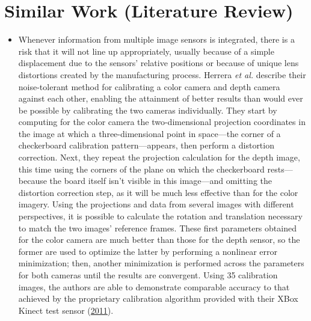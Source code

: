 \documentclass[12pt]{report}
\begin{document}
\section{Similar Work (Literature Review)}
\begin{itemize}
\item{Whenever information from multiple image sensors is integrated, there is a risk that it will not line up appropriately, usually because of a simple displacement due to the sensors' relative positions or because of unique lens distortions created by the manufacturing process.  Herrera \textit{et al.} describe their noise-tolerant method for calibrating a color camera and depth camera against each other, enabling the attainment of better results than would ever be possible by calibrating the two cameras individually.  They start by computing for the color camera the two-dimensional projection coordinates in the image at which a three-dimensional point in space---the corner of a checkerboard calibration pattern---appears, then perform a distortion correction.  Next, they repeat the projection calculation for the depth image, this time using the corners of the plane on which the checkerboard rests---because the board itself isn't visible in this image---and omitting the distortion correction step, as it will be much less effective than for the color imagery.  Using the projections and data from several images with different perspectives, it is possible to calculate the rotation and translation necessary to match the two images' reference frames.  These first parameters obtained for the color camera are much better than those for the depth sensor, so the former are used to optimize the latter by performing a nonlinear error minimization; then, another minimization is performed across the parameters for both cameras until the results are convergent.  Using 35 calibration images, the authors are able to demonstrate comparable accuracy to that achieved by the proprietary calibration algorithm provided with their XBox Kinect test sensor (\hyperref[bib:herrera]{2011}).}

\end{itemize}
\end{document}
